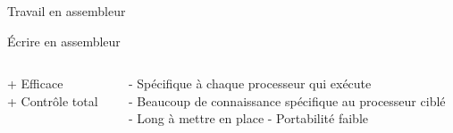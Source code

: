 \documentclass{backend/backend}
\begin{document}
\begin{frame}{Travail en assembleur}
        \centering
    \vfill
        \begin{blockSimple}{Écrire en assembleur}
        \begin{columns}
            \begin{column}{0.3\textwidth}
                + Efficace\\
                + Contrôle total
            \end{column}
            \begin{column}{0.5\textwidth}
            - Spécifique à chaque processeur qui exécute\\
            - Beaucoup de connaissance spécifique au processeur ciblé\\
            - Long à mettre en place
            - Portabilité faible
            \end{column}
        \end{columns}        
    \end{blockSimple}

     
\end{frame}
\end{document}
